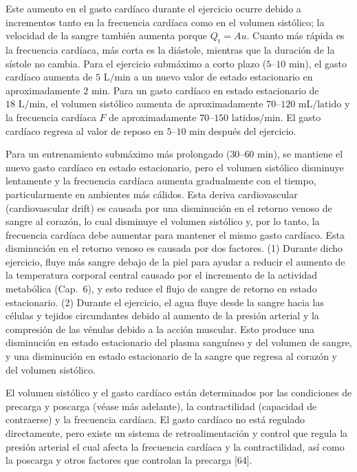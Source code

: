 \documentclass[12pt]{book}
\begin{document}
Este aumento en el gasto cardíaco durante el ejercicio ocurre debido a incrementos tanto en la frecuencia cardíaca como en el volumen sistólico; la velocidad de la sangre también aumenta porque $Q_{\text{t}} = A u$. Cuanto más rápida es la frecuencia cardíaca, más corta es la diástole, mientras que la duración de la sístole no cambia. Para el ejercicio submáximo a corto plazo ($5\text{--}10\text{ min}$), el gasto cardíaco aumenta de $5\text{ L/min}$ a un nuevo valor de estado estacionario en aproximadamente $2\text{ min}$. Para un gasto cardíaco en estado estacionario de $18\text{ L/min}$, el volumen sistólico aumenta de aproximadamente $70\text{--}120\text{ mL/latido}$ y la frecuencia cardíaca $F$ de aproximadamente $70\text{--}150\text{ latidos/min}$. El gasto cardíaco regresa al valor de reposo en $5\text{--}10\text{ min}$ después del ejercicio.

Para un entrenamiento submáximo más prolongado ($30\text{--}60\text{ min}$), se mantiene el nuevo gasto cardíaco en estado estacionario, pero el volumen sistólico disminuye lentamente y la frecuencia cardíaca aumenta gradualmente con el tiempo, particularmente en ambientes más cálidos. Esta deriva cardiovascular (cardiovascular drift) es causada por una disminución en el retorno venoso de sangre al corazón, lo cual disminuye el volumen sistólico y, por lo tanto, la frecuencia cardíaca debe aumentar para mantener el mismo gasto cardíaco. Esta disminución en el retorno venoso es causada por dos factores. (1) Durante dicho ejercicio, fluye más sangre debajo de la piel para ayudar a reducir el aumento de la temperatura corporal central causado por el incremento de la actividad metabólica (Cap.~6), y esto reduce el flujo de sangre de retorno en estado estacionario. (2) Durante el ejercicio, el agua fluye desde la sangre hacia las células y tejidos circundantes debido al aumento de la presión arterial y la compresión de las vénulas debido a la acción muscular. Esto produce una disminución en estado estacionario del plasma sanguíneo y del volumen de sangre, y una disminución en estado estacionario de la sangre que regresa al corazón y del volumen sistólico.

El volumen sistólico y el gasto cardíaco están determinados por las condiciones de precarga y poscarga (véase más adelante), la contractilidad (capacidad de contraerse) y la frecuencia cardíaca. El gasto cardíaco no está regulado directamente, pero existe un sistema de retroalimentación y control que regula la presión arterial el cual afecta la frecuencia cardíaca y la contractilidad, así como la poscarga y otros factores que controlan la precarga [64].
\end{document}
